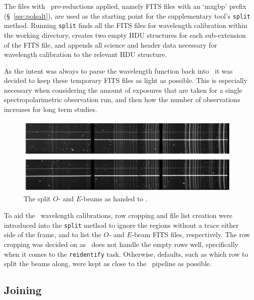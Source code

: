 The files with \polsalt\ pre-reductions applied, namely \gls{FITS} files with an `mxgbp' prefix (\S~\ref{sec:polsalt}), are used as the starting point for the supplementary tool's \texttt{split} method. Running \texttt{split} finds all the \gls{FITS} files for wavelength calibration within the working directory, creates two empty \gls{HDU} structures for each sub-extension of the \gls{FITS} file, and appends all science and header data necessary for wavelength calibration to the relevant \gls{HDU} structure.

As the intent was always to parse the wavelength function back into \polsalt\ it was decided to keep these temporary \gls{FITS} files as light as possible. This is especially necessary when considering the amount of exposures that are taken for a single spectropolarimetric observation run, and then how the number of observations increases for long term studies.

\begin{figure}[t]
    \centering
    \includegraphics[width = 1.0\textwidth]{figures/3_OEsplit.pdf}
    \caption{The split $O$- and $E$-beams as handed to \iraf.}
    \label{fig:OE_split}
\end{figure}

To aid the \iraf\ wavelength calibrations, row cropping and file list creation were introduced into the \texttt{split} method to ignore the regions without a trace either side of the frame, and to list the $O$- and $E$-beam \gls{FITS} files, respectively. The row cropping was decided on as \iraf\ does not handle the empty rows well, specifically when it comes to the \texttt{reidentify} task. Otherwise, defaults, such as which row to split the beams along, were kept as close to the \polsalt\ pipeline as possible.

\subsection{Joining}

